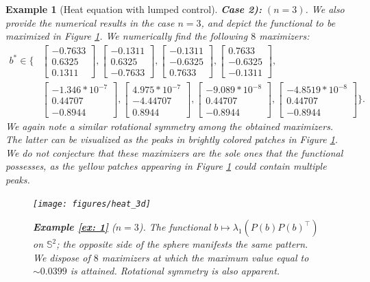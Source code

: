 \documentclass[11pt, a4paper, reqno]{amsart}
\theoremstyle{plain}
\numberwithin{equation}{section}
\newtheorem{example}{Example}[section]
\begin{document}
\begin{example}[Heat equation with lumped control]
	\smallskip
	\noindent \textbf{Case 2):} $(n=3)$. We also provide the numerical results in the case $n=3$, and depict the functional to be maximized in Figure \ref{fig: ex1.2}.  We numerically find the following $8$ maximizers: 
	\begin{align} \label{eq: ex1.2.max}
	b^* \in \Bigg\{&\begin{bmatrix} -0.7633\\ 0.6325\\0.1311\end{bmatrix}, 
\begin{bmatrix} -0.1311\\ 0.6325\\ -0.7633\end{bmatrix},
\begin{bmatrix} -0.1311\\ -0.6325\\ 0.7633\end{bmatrix},\begin{bmatrix} 0.7633\\ -0.6325\\ -0.1311\end{bmatrix},\\
&\begin{bmatrix} -1.346*10^{-7}\\ 0.44707\\ -0.8944\end{bmatrix}, \begin{bmatrix} 4.975*10^{-7}\\ -4.44707\\ 0.8944\end{bmatrix}, \begin{bmatrix} -9.089*10^{-8}\\ 0.44707\\ -0.8944\end{bmatrix}, 
\begin{bmatrix} -4.8519*10^{-8}\\ 0.44707\\-0.8944\end{bmatrix} \Bigg\} \nonumber.
	\end{align}
	We again note a similar rotational symmetry among the obtained maximizers. The latter can be visualized as the peaks in brightly colored patches in Figure \ref{fig: ex1.2}. We do not conjecture that these maximizers are the sole ones that the functional possesses, as the yellow patches appearing in Figure \ref{fig: ex1.2} could contain multiple peaks.
	
	\begin{figure}
	\texttt{[image: figures/heat\_3d]}	
	\caption{\textbf{Example \ref{ex: 1}} ($n=3$). The functional $b\mapsto \lambda_1(P(b)P(b)^\top)$ on $\mathbb{S}^2$; the opposite side of the sphere manifests the same pattern. We dispose of $8$ maximizers at which the maximum value equal to $\sim0.0399$ is attained. 
	Rotational symmetry is also apparent.}
	  \label{fig: ex1.2}
	  \end{figure}
	\end{example}
	
\end{document}
